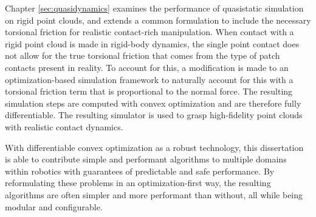 Chapter \ref{sec:quasidynamics} examines the performance of quasistatic simulation on rigid point clouds, and extends a common formulation to include the necessary torsional friction for realistic contact-rich manipulation. When contact with a rigid point cloud is made in rigid-body dynamics, the single point contact does not allow for the true torsional friction that comes from the type of patch contacts present in reality. To account for this, a modification is made to an optimization-based simulation framework to naturally account for this with a torsional friction term that is proportional to the normal force. The resulting simulation steps are computed with convex optimization and are therefore fully differentiable. The resulting simulator is used to grasp high-fidelity point clouds with realistic contact dynamics. 

With differentiable convex optimization as a robust technology, this dissertation is able to contribute simple and performant algorithms to multiple domains within robotics with guarantees of predictable and safe performance. By reformulating these problems in an optimization-first way, the resulting algorithms are often simpler and more performant than without, all while being modular and configurable.



